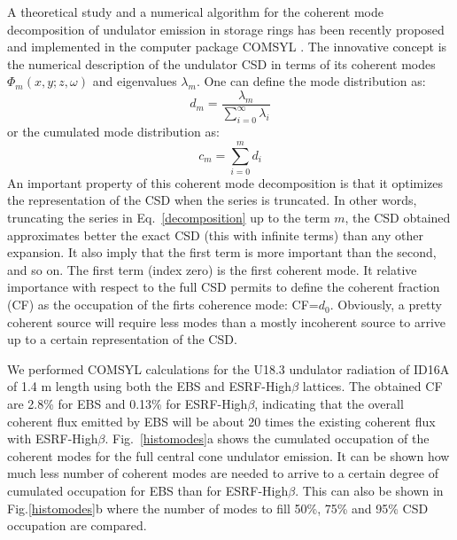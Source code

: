 \documentclass{iucr}              %
\begin{document}
A theoretical study and a numerical algorithm for the coherent mode decomposition of undulator emission in storage rings has been recently proposed  \cite{GlassThesis,GlassEPL} and implemented in the computer package COMSYL \cite{codeCOMSYL}. The innovative concept is the numerical description of the undulator CSD in terms of its coherent modes $\Phi_m(x,y;z,\omega)$ and eigenvalues $\lambda_m $. One can define the mode distribution as: 
\begin{equation}
 d_m = \frac{\lambda_m}{\sum\limits_{i=0}^{\infty} \lambda_i}
\end{equation}
or the cumulated mode distribution as: 
\begin{equation}
 c_m = \sum\limits_{i=0}^{m} d_i
\end{equation}
An important property of this coherent mode decomposition is that it optimizes the representation of the CSD when the series is truncated. In other words, truncating the series in Eq.~\ref{decomposition} up to the term $m$, the CSD obtained approximates better the exact CSD (this with infinite terms) than any other expansion. It also imply that the first term is more important than the second, and so on. The first term (index zero) is the first coherent mode. It relative importance with respect to the full CSD permits to define the coherent fraction (CF) as the occupation of the firts coherence mode: CF=$d_0$. Obviously, a pretty coherent source will require less modes than a mostly incoherent source to arrive up to a certain representation of the CSD.

We performed COMSYL calculations for the U18.3 undulator radiation of ID16A of 1.4 m length using both the EBS and ESRF-High$\beta$ lattices. The obtained CF are 2.8\% for EBS and 0.13\% for ESRF-High$\beta$, indicating that the overall coherent flux emitted by EBS will be about 20 times the existing coherent flux with ESRF-High$\beta$. Fig.~\ref{histomodes}a shows the cumulated occupation of the coherent modes for the full central cone undulator emission. It can be shown how much less number of coherent modes are needed to arrive to a certain degree of cumulated occupation for EBS than for ESRF-High$\beta$. This can also be shown in Fig.\ref{histomodes}b where the number of modes to fill 50\%, 75\% and 95\% CSD occupation are compared.   
\end{document}
